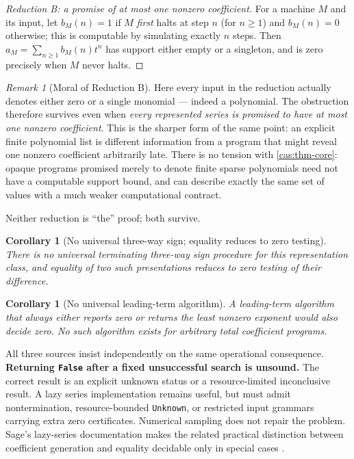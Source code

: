 \documentclass[11pt,letterpaper]{article}
\numberwithin{equation}{section}
\newtheorem{corollary}[theorem]{Corollary}
\theoremstyle{definition}
\theoremstyle{remark}
\newtheorem{remark}[theorem]{Remark}
\begin{document}
\begin{proof}[Reduction B: a promise of at most one nonzero coefficient]
For a machine $M$ and its input, let $b_M(n)=1$ if $M$ \emph{first} halts at
step $n$ (for $n\ge1$) and $b_M(n)=0$ otherwise; this is computable by
simulating exactly $n$ steps. Then $a_M=\sum_{n\ge1}b_M(n)t^n$ has support
either empty or a singleton, and is zero precisely when $M$ never halts.
\end{proof}

\begin{remark}[Moral of Reduction B]\label{cas:rem-moralB}
Here every input in the reduction actually denotes either zero or a single
monomial --- indeed a polynomial. The obstruction therefore survives even when
\emph{every represented series is promised to have at most one nonzero
coefficient}. This is the sharper form of the same point: an explicit finite
polynomial list is different information from a program that might reveal one
nonzero coefficient arbitrarily late. There is no tension with
\cref{cas:thm-core}: opaque programs promised merely to denote finite sparse
polynomials need not have a computable support bound, and can describe exactly
the same set of values with a much weaker computational contract.
\end{remark}

Neither reduction is ``the'' proof; both survive.

\begin{corollary}[No universal three-way sign; equality reduces to zero testing]
\label{cas:cor-sign}
There is no universal terminating three-way sign procedure for this
representation class, and equality of two such presentations reduces to zero
testing of their difference.
\end{corollary}

\begin{corollary}[No universal leading-term algorithm]\label{cas:cor-leading}
A leading-term algorithm that always either reports zero or returns the least
nonzero exponent would also decide zero. No such algorithm exists for arbitrary
total coefficient programs.
\end{corollary}

All three sources insist independently on the same operational consequence.
\textbf{Returning \texttt{False} after a fixed unsuccessful search is unsound.}
The correct result is an explicit unknown status or a resource-limited
inconclusive result. A lazy series implementation remains useful, but must admit
nontermination, resource-bounded \texttt{Unknown}, or restricted input grammars
carrying extra zero certificates. Numerical sampling does not repair the
problem. Sage's lazy-series documentation makes the related practical
distinction between coefficient generation and equality decidable only in
special cases \cite{cas:SageLazy}.
\end{document}

